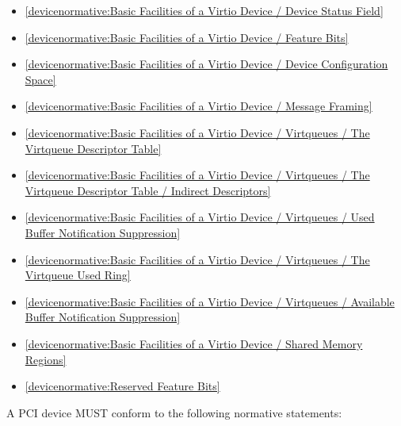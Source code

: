 \begin{itemize}
\item \ref{devicenormative:Basic Facilities of a Virtio Device / Device Status Field}
\item \ref{devicenormative:Basic Facilities of a Virtio Device / Feature Bits}
\item \ref{devicenormative:Basic Facilities of a Virtio Device / Device Configuration Space}
\item \ref{devicenormative:Basic Facilities of a Virtio Device / Message Framing}
\item \ref{devicenormative:Basic Facilities of a Virtio Device / Virtqueues / The Virtqueue Descriptor Table}
\item \ref{devicenormative:Basic Facilities of a Virtio Device / Virtqueues / The Virtqueue Descriptor Table / Indirect Descriptors}
\item \ref{devicenormative:Basic Facilities of a Virtio Device / Virtqueues / Used Buffer Notification Suppression}
\item \ref{devicenormative:Basic Facilities of a Virtio Device / Virtqueues / The Virtqueue Used Ring}
\item \ref{devicenormative:Basic Facilities of a Virtio Device / Virtqueues / Available Buffer Notification Suppression}
\item \ref{devicenormative:Basic Facilities of a Virtio Device / Shared Memory Regions}
\item \ref{devicenormative:Reserved Feature Bits}
\end{itemize}

\label{sec:Conformance / Device Conformance / PCI Device Conformance}

A PCI device MUST conform to the following normative statements:

